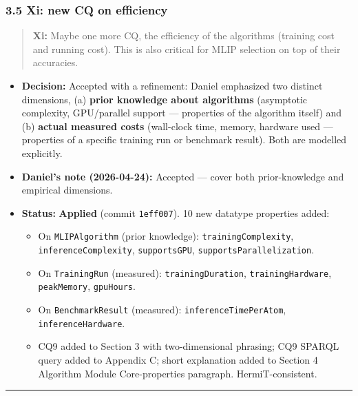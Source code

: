 \subsubsection{3.5 Xi: new CQ on efficiency}\label{xi-new-cq-on-efficiency}

\begin{quote}
\textbf{Xi:} Maybe one more CQ, the efficiency of the algorithms (training cost and running cost). This is also critical for MLIP selection on top of their accuracies.
\end{quote}

\begin{itemize}
\tightlist
\item
  \textbf{Decision:} Accepted with a refinement: Daniel emphasized two distinct dimensions, (a) \textbf{prior knowledge about algorithms} (asymptotic complexity, GPU/parallel support --- properties of the algorithm itself) and (b) \textbf{actual measured costs} (wall-clock time, memory, hardware used --- properties of a specific training run or benchmark result). Both are modelled explicitly.
\item
  \textbf{Daniel's note (2026-04-24):} Accepted --- cover both prior-knowledge and empirical dimensions.
\item
  \textbf{Status:} {\color{green!60!black}\faCheckCircle} \textbf{Applied} (commit \texttt{1eff007}). 10 new datatype properties added:

  \begin{itemize}
  \tightlist
  \item
    On \texttt{MLIPAlgorithm} (prior knowledge): \texttt{trainingComplexity}, \texttt{inferenceComplexity}, \texttt{supportsGPU}, \texttt{supportsParallelization}.
  \item
    On \texttt{TrainingRun} (measured): \texttt{trainingDuration}, \texttt{trainingHardware}, \texttt{peakMemory}, \texttt{gpuHours}.
  \item
    On \texttt{BenchmarkResult} (measured): \texttt{inferenceTimePerAtom}, \texttt{inferenceHardware}.
  \item
    CQ9 added to Section 3 with two-dimensional phrasing; CQ9 SPARQL query added to Appendix C; short explanation added to Section 4 Algorithm Module Core-properties paragraph. HermiT-consistent.
  \end{itemize}
\end{itemize}

\begin{center}\rule{0.5\linewidth}{0.5pt}\end{center}

